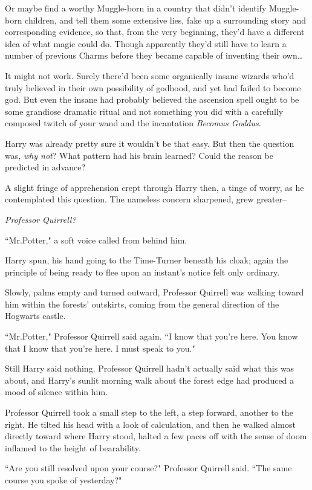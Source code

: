 Or maybe find a worthy Muggle-born in a country that didn't identify Muggle-born children, and tell them some extensive lies, fake up a surrounding story and corresponding evidence, so that, from the very beginning, they'd have a different idea of what magic could do. Though apparently they'd still have to learn a number of previous Charms before they became capable of inventing their own{\ldots}

It might not work. Surely there'd been some organically insane wizards who'd truly believed in their own possibility of godhood, and yet had failed to become god. But even the insane had probably believed the ascension spell ought to be some grandiose dramatic ritual and not something you did with a carefully composed twitch of your wand and the incantation \emph{Becomus Goddus}.

Harry was already pretty sure it wouldn't be that easy. But then the question was, \emph{why not}? What pattern had his brain learned? Could the reason be predicted in advance?

A slight fringe of apprehension crept through Harry then, a tinge of worry, as he contemplated this question. The nameless concern sharpened, grew greater\---

\emph{Professor Quirrell?}

``Mr.\?Potter," a soft voice called from behind him.

Harry spun, his hand going to the Time-Turner beneath his cloak; again the principle of being ready to flee upon an instant's notice felt only ordinary.

Slowly, palms empty and turned outward, Professor Quirrell was walking toward him within the forests' outskirts, coming from the general direction of the Hogwarts castle.

``Mr.\?Potter," Professor Quirrell said again. ``I know that you're here. You know that I know that you're here. I must speak to you."

Still Harry said nothing. Professor Quirrell hadn't actually said what this was about, and Harry's sunlit morning walk about the forest edge had produced a mood of silence within him.

Professor Quirrell took a small step to the left, a step forward, another to the right. He tilted his head with a look of calculation, and then he walked almost directly toward where Harry stood, halted a few paces off with the sense of doom inflamed to the height of bearability.

``Are you still resolved upon your course?" Professor Quirrell said. ``The same course you spoke of yesterday?"

